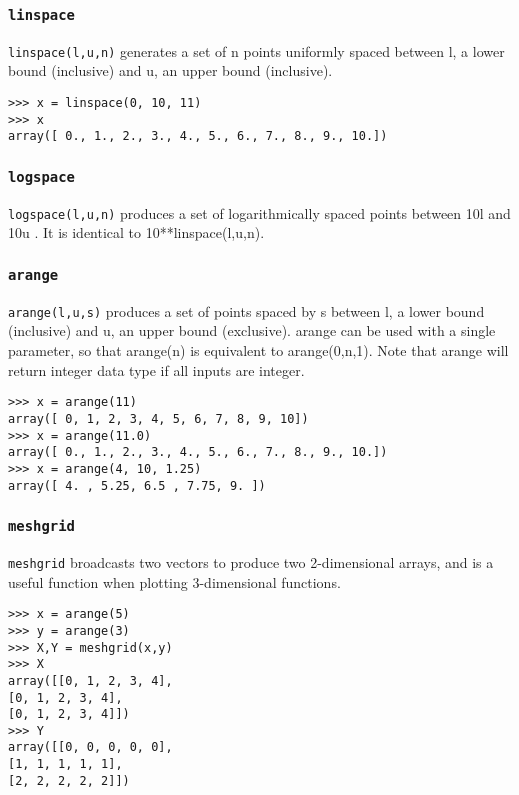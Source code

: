 \documentclass[KSmain.tex]{subfiles}
\begin{document}
\subsubsection*{\texttt{linspace}}
\texttt{linspace(l,u,n)} generates a set of n points uniformly spaced between l, a lower bound (inclusive) and u,
an upper bound (inclusive).
\begin{framed}
\begin{verbatim}
>>> x = linspace(0, 10, 11)
>>> x
array([ 0., 1., 2., 3., 4., 5., 6., 7., 8., 9., 10.])
\end{verbatim}
\end{framed}
\subsubsection*{\texttt{logspace}}
\texttt{logspace(l,u,n)} produces a set of logarithmically spaced points between 10l and 10u . It is identical to
10**linspace(l,u,n).
\subsubsection*{\texttt{arange}}
\texttt{arange(l,u,s)} produces a set of points spaced by s between l, a lower bound (inclusive) and u, an upper
bound (exclusive). arange can be used with a single parameter, so that arange(n) is equivalent to
arange(0,n,1). Note that arange will return integer data type if all inputs are integer.
\begin{framed}
\begin{verbatim}
>>> x = arange(11)
array([ 0, 1, 2, 3, 4, 5, 6, 7, 8, 9, 10])
>>> x = arange(11.0)
array([ 0., 1., 2., 3., 4., 5., 6., 7., 8., 9., 10.])
>>> x = arange(4, 10, 1.25)
array([ 4. , 5.25, 6.5 , 7.75, 9. ])
\end{verbatim}
\end{framed}
\subsubsection{\texttt{meshgrid}}
\texttt{meshgrid} broadcasts two vectors to produce two 2-dimensional arrays, and is a useful function when plotting
3-dimensional functions.
\begin{framed}
\begin{verbatim}
>>> x = arange(5)
>>> y = arange(3)
>>> X,Y = meshgrid(x,y)
>>> X
array([[0, 1, 2, 3, 4],
[0, 1, 2, 3, 4],
[0, 1, 2, 3, 4]])
>>> Y
array([[0, 0, 0, 0, 0],
[1, 1, 1, 1, 1],
[2, 2, 2, 2, 2]])
\end{verbatim}
\end{framed}
\end{document}
